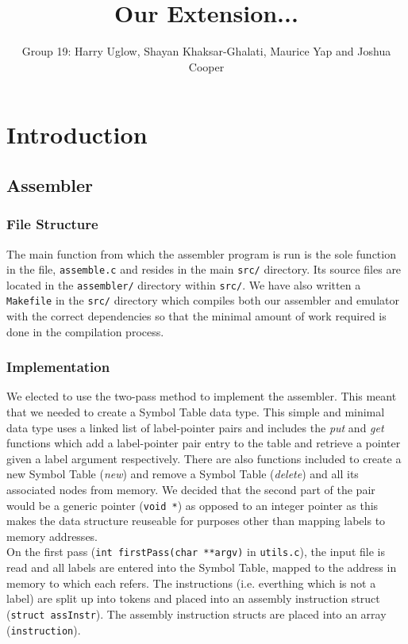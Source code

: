 \documentclass[11pt]{article}
\begin{document}
\title{Our Extension...}
\author{Group 19: Harry Uglow, Shayan Khaksar-Ghalati, Maurice Yap and Joshua Cooper}

\maketitle

\section{Introduction}

\subsection{Assembler}
\subsubsection{File Structure}
The main function from which the assembler program is run is the sole function in the file, \texttt{assemble.c} and resides in the main \texttt{src/} directory. Its source files are located in the \texttt{assembler/} directory within \texttt{src/}. We have also written a \texttt{Makefile} in the \texttt{src/} directory which compiles both our assembler and emulator with the correct dependencies so that the minimal amount of work required is done in the compilation process.
\subsubsection{Implementation}
We elected to use the two-pass method to implement the assembler. This meant that we needed to create a Symbol Table data type. This simple and minimal data type uses a linked list of label-pointer pairs and includes the \textit{put} and \textit{get} functions which add a label-pointer pair entry to the table and retrieve a pointer given a label argument respectively. There are also functions included to create a new Symbol Table (\textit{new}) and remove a Symbol Table (\textit{delete}) and all its associated nodes from memory. We decided that the second part of the pair would be a generic pointer (\texttt{void *}) as opposed to an integer pointer as this makes the data structure reuseable for purposes other than mapping labels to memory addresses.\\

On the first pass (\texttt{int firstPass(char **argv)} in \texttt{utils.c}), the input file is read and all labels are entered into the Symbol Table, mapped to the address in memory to which each refers. The instructions (i.e. everthing which is not a label) are split up into tokens and placed into an assembly instruction struct (\texttt{struct assInstr}). The assembly instruction structs are placed into an array (\texttt{instruction}).\\
\end{document}

